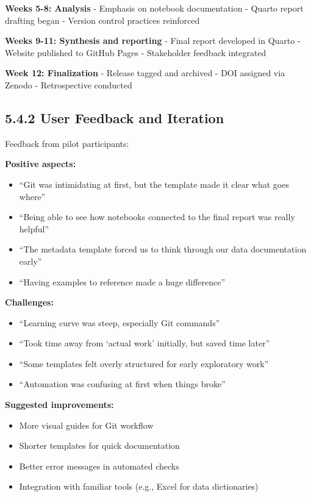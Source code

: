 \documentclass[
  oneside,
  open=any]{scrbook}
\providecommand{\tightlist}{%
  \setlength{\itemsep}{0pt}\setlength{\parskip}{0pt}}\usepackage{longtable,booktabs,array}
\begin{document}
\textbf{Weeks 5-8: Analysis} - Emphasis on notebook documentation -
Quarto report drafting began - Version control practices reinforced

\textbf{Weeks 9-11: Synthesis and reporting} - Final report developed in
Quarto - Website published to GitHub Pages - Stakeholder feedback
integrated

\textbf{Week 12: Finalization} - Release tagged and archived - DOI
assigned via Zenodo - Retrospective conducted

\subsection{5.4.2 User Feedback and
Iteration}\label{user-feedback-and-iteration}

Feedback from pilot participants:

\textbf{Positive aspects:}

\begin{itemize}
\tightlist
\item
  ``Git was intimidating at first, but the template made it clear what
  goes where''
\item
  ``Being able to see how notebooks connected to the final report was
  really helpful''
\item
  ``The metadata template forced us to think through our data
  documentation early''
\item
  ``Having examples to reference made a huge difference''
\end{itemize}

\textbf{Challenges:}

\begin{itemize}
\tightlist
\item
  ``Learning curve was steep, especially Git commands''
\item
  ``Took time away from `actual work' initially, but saved time later''
\item
  ``Some templates felt overly structured for early exploratory work''
\item
  ``Automation was confusing at first when things broke''
\end{itemize}

\textbf{Suggested improvements:}

\begin{itemize}
\tightlist
\item
  More visual guides for Git workflow
\item
  Shorter templates for quick documentation
\item
  Better error messages in automated checks
\item
  Integration with familiar tools (e.g., Excel for data dictionaries)
\end{itemize}
\end{document}
